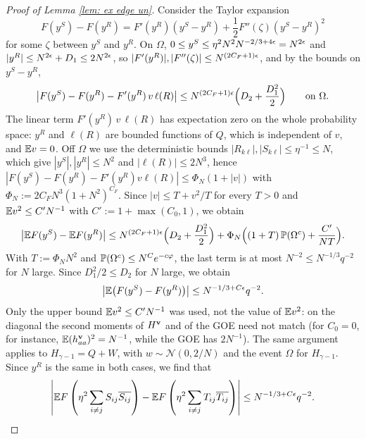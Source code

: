 \begin{proof}[Proof of Lemma \ref{lem: ex edge un}]
Consider the Taylor expansion
\begin{equation}
F(y^S) - F(y^R) = F'(y^R) (y^S - y^R) + \frac{1}{2} F'' (\zeta) (y^S - y^R)^2
\end{equation}
for some $\zeta$ between $y^S$ and $y^R$. On $\Omega$, $0\le y^S\le\eta^2N^2N^{-2/3+4\epsilon}=N^{2\epsilon}$ and $|y^R|\le N^{2\epsilon}+D_1\le 2N^{2\epsilon}$, so $|F'(y^R)|,|F''(\zeta)|\le N^{(2C_F+1)\epsilon}$, and by the bounds on $y^S-y^R$,
$$
\big|F(y^S)-F(y^R)-F'(y^R)\,v\,\ell(R)\big|\le N^{(2C_F+1)\epsilon}\Big(D_2+\frac{D_1^2}{2}\Big)\qquad\text{on }\Omega .
$$
The linear term $F'(y^R)\,v\,\ell(R)$ has expectation zero on the whole probability space: $y^R$ and $\ell(R)$ are bounded functions of $Q$, which is independent of $v$, and $\mathbb{E} v=0$. Off $\Omega$ we use the deterministic bounds $|R_{k\ell}|,|S_{k\ell}|\le\eta^{-1}\le N$, which give $|y^S|,|y^R|\le N^2$ and $|\ell(R)|\le 2N^3$, hence $|F(y^S)-F(y^R)-F'(y^R)v\ell(R)|\le\Phi_N(1+|v|)$ with $\Phi_N:=2C_FN^3(1+N^2)^{C_F}$. Since $|v|\le T+v^2/T$ for every $T>0$ and $\mathbb{E} v^2\le C'N^{-1}$ with $C':=1+\max(C_0,1)$, we obtain
\begin{equation} \label{eq:diag_bad}
\big|\mathbb{E} F(y^S)-\mathbb{E} F(y^R)\big|\le N^{(2C_F+1)\epsilon}\Big(D_2+\frac{D_1^2}{2}\Big)+\Phi_N\Big((1+T)\,\mathbb{P}(\Omega^c)+\frac{C'}{NT}\Big).
\end{equation}
With $T:=\Phi_NN^2$ and $\mathbb{P}(\Omega^c)\le N^Ce^{-c\varphi}$, the last term is at most $N^{-2}\le N^{-1/3}q^{-2}$ for $N$ large. Since $D_1^2/2\le D_2$ for $N$ large, we obtain
\begin{equation}
\left| \mathbb{E} \big( F(y^S) - F(y^R) \big) \right| \leq N^{-1/3 + C\epsilon} q^{-2}.
\end{equation}
Only the upper bound $\mathbb{E} v^2\le C'N^{-1}$ was used, not the value of $\mathbb{E} v^2$: on the diagonal the second moments of $H^{\mathbf{v}}$ and of the GOE need not match (for $C_0=0$, for instance, $\mathbb{E}(h^{\mathbf{v}}_{aa})^2=N^{-1}$, while the GOE has $2N^{-1}$). The same argument applies to $H_{\gamma-1}=Q+W$, with $w\sim\mathcal N(0,2/N)$ and the event $\Omega$ for $H_{\gamma-1}$. Since $y^R$ is the same in both cases, we find that
\begin{equation} \label{eq:S-T 2}
\left| \mathbb{E} F \left( \eta^2 \sum_{i \neq j} S_{ij} \overline{S_{ij}} \right) - \mathbb{E} F \left( \eta^2 \sum_{i \neq j} T_{ij} \overline{T_{ij}} \right) \right| \leq N^{-1/3 + C \epsilon} q^{-2}.
\end{equation}


\end{proof}

